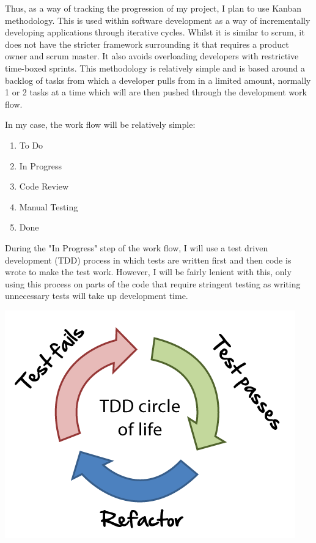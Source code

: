 \documentclass[]{report}
\begin{document}
		Thus, as a way of tracking the progression of my project, I plan to use Kanban methodology. This is used within software development as a way of incrementally developing applications through iterative cycles. Whilst it is similar to scrum, it does not have the stricter framework surrounding it that requires a product owner and scrum master. It also avoids overloading developers with restrictive time-boxed sprints. This methodology is relatively simple and is based around a backlog of tasks from which a developer pulls from in a limited amount, normally 1 or 2 tasks at a time which will are then pushed through the development work flow.
		
		In my case, the work flow will be relatively simple:
		\begin{enumerate}
			\item To Do
			\item In Progress
			\item Code Review
			\item Manual Testing
			\item Done
		\end{enumerate}
		During the "In Progress" step of the work flow, I will use a test driven development (TDD) process in which tests are written first and then code is wrote to make the test work. However, I will be fairly lenient with this, only using this process on parts of the code that require stringent testing as writing unnecessary tests will take up development time. 
		
		\begin{center}
			\includegraphics[scale=0.5]{tdd-circle-of-life.png}
		\end{center}
		
\end{document}
